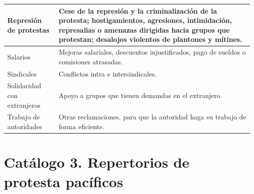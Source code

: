 \documentclass[letterpaper, 11pt]{book}
\theoremstyle{definition}
\theoremstyle{remark}
\begin{document}
{{{{{{{{{{\begin{footnotesize}
\begin{longtable}{|p{4cm}@{ }|p{11cm}@{ }|}
\hline
Represión de protestas & Cese de la represión y la criminalización de la protesta; hostigamientos, agresiones, intimidación, represalias o amenazas dirigidas hacia grupos que protestan; desalojos violentos de plantones y mítines.\\
\hline
Salarios & Mejoras salariales, descuentos injustificados, pago de sueldos o comisiones atrasadas.\\
\hline
Sindicales & Conflictos intra e intersindicales.\\
\hline
Solidaridad con extranjeros &  Apoyo a grupos que tienen demandas en el extranjero.\\
\hline
Trabajo de autoridades & Otras reclamaciones, para que la autoridad haga su trabajo de forma eficiente.\\
\hline
\end{longtable}
\end{footnotesize}
\newpage






\section*{Catálogo 3. Repertorios de protesta pacíficos}
\label{Anexo_RepertoriosPacificos}

}}}}}}}}}}
\end{document}
